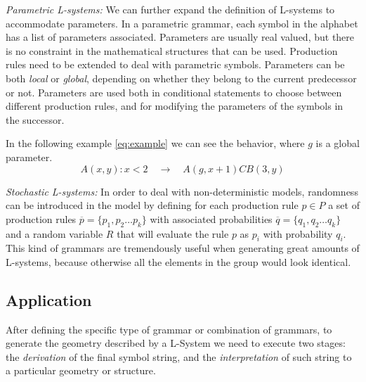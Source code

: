 \documentclass[letterpaper,twoside,11pt]{article}
\begin{document}
\begin{multicols}{2}
\emph{Parametric L-systems:} We can further expand the definition of L-systems to accommodate parameters. In a parametric grammar, each symbol in the alphabet has a list of parameters associated. Parameters are usually real valued, but there is no constraint in the mathematical structures that can be used. Production rules need to be extended to deal with parametric symbols. Parameters can be both \emph{local} or \emph{global}, depending on whether they belong to the current predecessor or not. Parameters are used both in conditional statements to choose between different production rules, and for modifying the parameters of the symbols in the successor.

In the following example \eqref{eq:example} we can see the behavior, where $g$ is a global parameter.
\begin{equation}
\label{eq:example}
	A(x,y) : x < 2 \quad\rightarrow\quad A(g,x+1) C B(3,y)
\end{equation}

\emph{Stochastic L-systems:} In order to deal with non-deterministic models, randomness can be introduced in the model by defining for each production rule $p \in P$ a set of production rules $\overline{p} = \{p_1,p_2\ldots p_k\}$ with associated probabilities $\overline{q} = \{q_1,q_2\ldots q_k\}$ and a random variable $R$ that will evaluate the rule $p$ as $p_i$ with probability $q_i$. This kind of grammars are tremendously useful when generating great amounts of L-systems, because otherwise all the elements in the group would look identical.


\subsection{Application} %
\label{sub:application}

After defining the specific type of grammar or combination of grammars, to generate the geometry described by a L-System we need to execute two stages: the \emph{derivation} of the final symbol string, and the \emph{interpretation} of such string to a particular geometry or structure.


\end{multicols}
\end{document}
